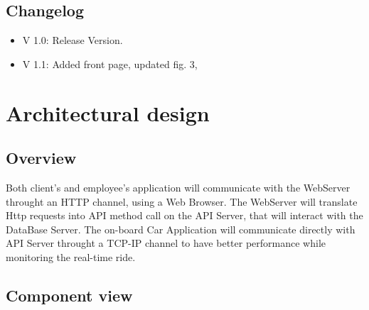 \documentclass{article}
\begin{document}
\subsection{Changelog}
\begin{itemize}[noitemsep]
\item V 1.0: Release Version.
\item V 1.1: Added front page, updated fig. 3,
\end{itemize}
\newpage
\section{Architectural design}
\subsection{Overview}
\begin{figure}[ht]
\end{figure}

Both client's and employee's application will communicate with the WebServer throught an HTTP channel, using a Web Browser.
The WebServer will translate Http requests into API method call on the API Server, that will interact with the DataBase Server.
The on-board Car Application will communicate directly with API Server throught a TCP-IP channel to have better performance
while monitoring the real-time ride.
\newpage
\subsection{Component view}
\end{document}
